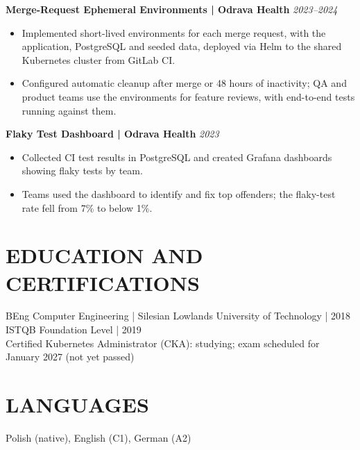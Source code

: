 \documentclass[11pt,a4paper]{article}
\begin{document}
\textbf{Merge-Request Ephemeral Environments | Odrava Health} \hfill \textit{2023--2024}
\begin{itemize}
\item Implemented short-lived environments for each merge request, with the application, PostgreSQL and seeded data, deployed via Helm to the shared Kubernetes cluster from GitLab CI.
\item Configured automatic cleanup after merge or 48 hours of inactivity; QA and product teams use the environments for feature reviews, with end-to-end tests running against them.
\end{itemize}

\textbf{Flaky Test Dashboard | Odrava Health} \hfill \textit{2023}
\begin{itemize}
\item Collected CI test results in PostgreSQL and created Grafana dashboards showing flaky tests by team.
\item Teams used the dashboard to identify and fix top offenders; the flaky-test rate fell from 7\% to below 1\%.
\end{itemize}

\section*{EDUCATION AND CERTIFICATIONS}
BEng Computer Engineering | Silesian Lowlands University of Technology | 2018\\
ISTQB Foundation Level | 2019\\
Certified Kubernetes Administrator (CKA): studying; exam scheduled for January 2027 (not yet passed)

\section*{LANGUAGES}
Polish (native), English (C1), German (A2)
\end{document}
